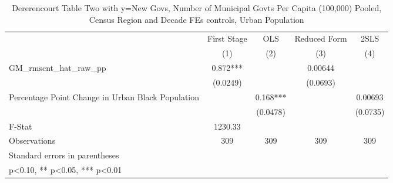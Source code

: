 \begin{table}[htbp]\centering
\def\sym#1{\ifmmode^{#1}\else\(^{#1}\)\fi}
\caption{Dererencourt Table Two with y=New Govs, Number of Municipal Govts Per Capita (100,000) Pooled, Census Region and Decade FEs controls, Urban Population}
\begin{tabular}{l*{4}{c}}
\toprule
                    & First Stage   &         OLS   &Reduced Form   &        2SLS   \\
                    &\multicolumn{1}{c}{(1)}   &\multicolumn{1}{c}{(2)}   &\multicolumn{1}{c}{(3)}   &\multicolumn{1}{c}{(4)}   \\
\midrule
GM\_rmscnt\_hat\_raw\_pp&       0.872***&               &     0.00644   &               \\
                    &    (0.0249)   &               &    (0.0693)   &               \\
\addlinespace
Percentage Point Change in Urban Black Population&               &       0.168***&               &     0.00693   \\
                    &               &    (0.0478)   &               &    (0.0735)   \\
\midrule
F-Stat              &     1230.33   &               &               &               \\
Observations        &         309   &         309   &         309   &         309   \\
\bottomrule
\multicolumn{5}{l}{\footnotesize Standard errors in parentheses}\\
\multicolumn{5}{l}{\footnotesize * p<0.10, ** p<0.05, *** p<0.01}\\
\end{tabular}
\end{table}
